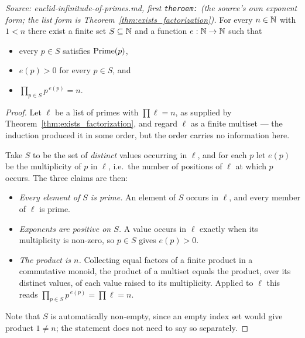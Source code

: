 \begin{theorem}
  \leanok
  \label{thm:exists_factorization_pow}
  \textit{Source: euclid-infinitude-of-primes.md, first \texttt{theroem:} (the
  source's own exponent form; the list form is Theorem~\ref{thm:exists_factorization}).}
  For every $n \in \mathbb{N}$ with $1 < n$ there exist a finite set $S \subseteq \mathbb{N}$
  and a function $e : \mathbb{N} \to \mathbb{N}$ such that
  \begin{itemize}
    \item every $p \in S$ satisfies $\mathrm{Prime}(p)$,
    \item $e(p) > 0$ for every $p \in S$, and
    \item $\displaystyle\prod_{p \in S} p^{\,e(p)} = n$.
  \end{itemize}
\end{theorem}
\begin{proof}
  \leanok
  Let $\ell$ be a list of primes with $\prod \ell = n$, as supplied by
  Theorem~\ref{thm:exists_factorization}, and regard $\ell$ as a finite
  multiset --- the induction produced it in some order, but the order carries no
  information here.

  Take $S$ to be the set of \emph{distinct} values occurring in $\ell$, and for
  each $p$ let $e(p)$ be the multiplicity of $p$ in $\ell$, i.e.\ the number of
  positions of $\ell$ at which $p$ occurs. The three claims are then:

  \begin{itemize}
    \item \emph{Every element of $S$ is prime.} An element of $S$ occurs in
      $\ell$, and every member of $\ell$ is prime.
    \item \emph{Exponents are positive on $S$.} A value occurs in $\ell$ exactly
      when its multiplicity is non-zero, so $p \in S$ gives $e(p) > 0$.
    \item \emph{The product is $n$.} Collecting equal factors of a finite
      product in a commutative monoid, the product of a multiset equals the
      product, over its distinct values, of each value raised to its
      multiplicity. Applied to $\ell$ this reads
      $\prod_{p \in S} p^{\,e(p)} = \prod \ell = n$.
  \end{itemize}

  Note that $S$ is automatically non-empty, since an empty index set would give
  product $1 \neq n$; the statement does not need to say so separately.
\end{proof}

